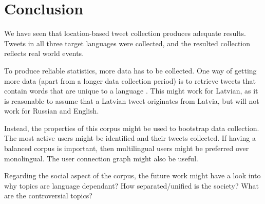 \documentclass[11pt,a4paper]{article}
\begin{document}


\section{Conclusion}

We have seen that location-based tweet collection produces adequate results. Tweets in all three target languages were collected, and the resulted collection reflects real world events.

To produce reliable statistics, more data has to be collected. One way of getting more data (apart from a longer data collection period) is to retrieve tweets that contain words that are unique to a language \cite{sang2013}. This might work for Latvian, as it is reasonable to assume that a Latvian tweet originates from Latvia, but will not work for Russian and English.

Instead, the properties of this corpus might be used to bootstrap data collection. The most active users might be identified and their tweets collected. If having a balanced corpus is important, then multilingual users might be preferred over monolingual. The user connection graph might also be useful.

Regarding the social aspect of the corpus, the future work might have a look into why topics are language dependant? How separated/unified is the society? What are the controversial topics?



\end{document}
